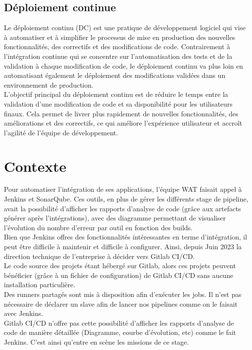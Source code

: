 	\subsection{Déploiement continue}
		Le déploiement continu (DC) est une pratique de développement logiciel qui vise à automatiser et à simplifier le processus de mise en production des nouvelles fonctionnalités, des correctifs et des modifications de code. Contrairement à l'intégration continue qui se concentre sur l'automatisation des tests et de la validation à chaque modification de code, le déploiement continu va plus loin en automatisant également le déploiement des modifications validées dans un environnement de production.\\
		
		L'objectif principal du déploiement continu est de réduire le temps entre la validation d'une modification de code et sa disponibilité pour les utilisateurs finaux. Cela permet de livrer plus rapidement de nouvelles fonctionnalités, des améliorations et des correctifs, ce qui améliore l'expérience utilisateur et accroît l'agilité de l'équipe de développement.\\
	\section{Contexte}		
		
		Pour automatiser l'intégration de ses applications, l'équipe WAT faisait appel à Jenkins et SonarQube. Ces outils, en plus de gérer les différents stage de pipeline, avait la possibilité d'afficher les rapports d'analyse de code (grâce aux artefacts générer après l'intégrations), avec des diagramme permettant de visualiser l'évolution du nombre d'erreur par outil en fonction des builds.\\
		
		Bien que Jenkins offres des fonctionnalités intéressantes en terme d'intégration, il peut être difficile à maintenir et difficile à configurer. Ainsi, depuis Juin 2023 la direction technique de l'entreprise à décider vers Gitlab CI/CD.\\
		
		Le code source des projets étant hébergé sur Gitlab, alors ces projets peuvent bénéficier (grâce à un fichier de configuration) de Gitlab CI/CD sans aucune installation particulière.\\
		Des runners partagés sont mis à disposition afin d’exécuter les jobs. Il n'est pas nécessaire de déclarer un slave afin de lancer nos pipelines comme on le faisait avec Jenkins.\\
		Gitlab CI/CD n'offre pas cette possibilité d'afficher les rapports d'analyse de code de manière détaillée (Diagramme, courbe d'évolution, etc) comme le fait Jenkins.
		C'est ainsi qu'entre en scène les missions de ce stage.
		
